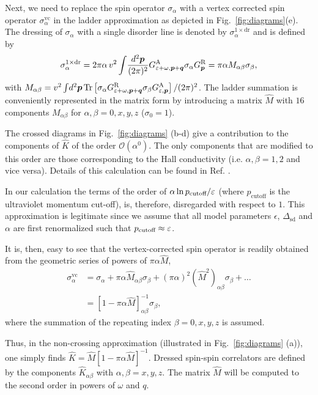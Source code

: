 Next, we need to replace the spin operator $\sigma_\alpha$ with a vertex corrected spin operator $\sigma_\alpha^\text{vc}$ in the ladder approximation as depicted in Fig.~\ref{fig:diagrams}(e). The dressing of $\sigma_\alpha$ with a single disorder line is denoted by $\sigma_\alpha^{1\times\text{dr}}$ and is defined by
    \begin{align}
       \sigma_\alpha^{1\times\text{dr}}  = 2\pi \alpha\, v^2 \int\!\frac{d^2\boldsymbol{p}}{(2\pi)^2} G^\text{A}_{\varepsilon+\omega,\boldsymbol{p}+\boldsymbol{q}}\sigma_\alpha G^\text{R}_{\boldsymbol{p}} = \pi\alpha M_{\alpha\beta}\sigma_\beta,
        \label{chap1:eq:myseries}
    \end{align}
with $M_{\alpha\beta}=v^2\int\!d^2\boldsymbol{p}\operatorname{Tr}\left[\sigma_\alpha G^\text{R}_{\varepsilon+\omega,\boldsymbol{p}+\boldsymbol{q}}\sigma_\beta G^\text{A}_{\varepsilon,\boldsymbol{p}}\right]/(2\pi)^2$. 
The ladder summation is conveniently represented in the matrix form by introducing a matrix $\hat{M}$ with $16$ components $M_{\alpha\beta}$ for $\alpha,\beta=0,x,y,z$ ($\sigma_0=1$). 

The crossed diagrams in Fig.~\ref{fig:diagrams} (b-d) give a contribution to the components of $\hat{K}$ of the order $\mathcal{O}(\alpha^0)$. The only components that are modified to this order are those corresponding to the Hall conductivity (i.e. $\alpha,\beta=1,2$ and vice versa). Details of this calculation can be found in Ref. \cite{ivan}. 

In our calculation the terms of the order of $\alpha \ln p_\textrm{cutoff}/\varepsilon$ (where $p_\textrm{cutoff}$ is the ultraviolet momentum cut-off), is, therefore, disregarded with respect to $1$. This approximation is legitimate since we assume that all model parameters $\epsilon$, $\Delta_\textrm{sd}$ and $\alpha$ are first renormalized such that $p_\textrm{cutoff} \approx \varepsilon$.

It is, then, easy to see that the vertex-corrected spin operator is readily obtained from the geometric series of powers of $\pi\alpha \hat{M}$, 
\begin{align}
\sigma_\alpha^\text{vc} &= 
\sigma_\alpha+\pi\alpha \hat{M}_{\alpha\beta}\sigma_\beta+(\pi\alpha)^2 (\hat{M}^2)_{\alpha\beta}\sigma_\beta+\dots\nonumber\\
&=\left[1-\pi\alpha \hat{M}\right]^{-1}_{\alpha\beta}\sigma_\beta,
\end{align}
where the summation of the repeating index $\beta=0,x,y,z$ is assumed. 

Thus, in the non-crossing approximation (illustrated in Fig.~\ref{fig:diagrams} (a)), one simply finds $\hat{K}= \hat{M}[1-\pi\alpha \hat{M}]^{-1}$. Dressed spin-spin correlators are defined by the components $ \hat{K}_{\alpha\beta}$ with $\alpha,\beta=x,y,z$. The matrix $\hat{M}$ will be computed to the second order in powers of $\omega$ and  $q$. 

